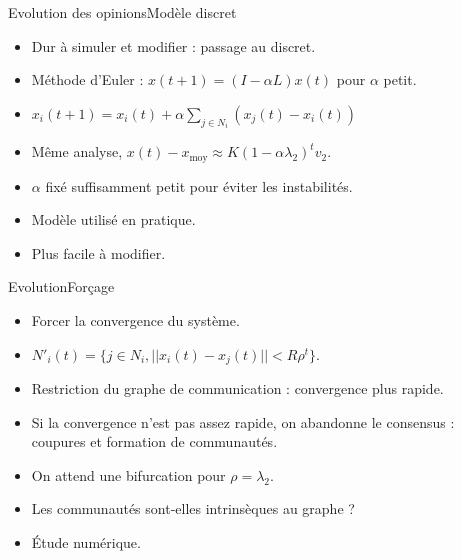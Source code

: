 \documentclass{beamer}
\begin{document}
\begin{frame}{Evolution des opinions}{Modèle discret}
  \begin{itemize}
  \item Dur à simuler et modifier : passage au discret.
  \item Méthode d'Euler : $x(t+1) = (I - \alpha L) x(t)$ pour $\alpha$
    petit.
  \item $x_i(t+1) = x_i(t) + \alpha \sum_{j \in N_i} (x_j(t) - x_i(t))$
  \item Même analyse, $x(t) - x_\text{moy} \approx K (1 - \alpha
    \lambda_2)^t v_2$.
  \item $\alpha$ fixé suffisamment petit pour éviter les instabilités.
  \item Modèle utilisé en pratique.
  \item Plus facile à modifier.
  \end{itemize}
\end{frame}

\begin{frame}{Evolution}{Forçage}
  \begin{itemize}
  \item Forcer la convergence du système.
  \item $N'_{i}(t) = \{j \in N_i, ||x_i(t) - x_j(t)|| < R \rho^t\}.$
  \item Restriction du graphe de communication : convergence plus rapide.
  \item Si la convergence n'est pas assez rapide, on abandonne le
    consensus : coupures et formation de communautés.
  \item On attend une bifurcation pour $\rho = \lambda_2$.
  \item Les communautés sont-elles intrinsèques au graphe ?
  \item Étude numérique.
  \end{itemize}
\end{frame}
\end{document}
